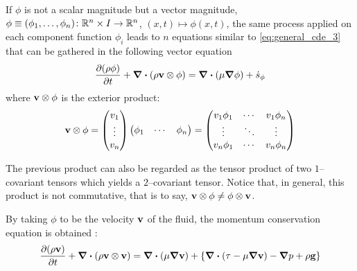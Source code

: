 If $\phi$ is not a scalar magnitude but a vector magnitude, \ie $\phi \equiv
(\phi_1, \ldots, \phi_n) \colon \mathbb{R}^n \times I \to \mathbb{R}^n$, $(x, t)
\mapsto \phi(x, t)$, the same process applied on each component function
$\phi_i$ leads to $n$ equations similar to \eqref{eq:general_cde_3} that can be
gathered in the following vector equation
\begin{equation}
	\pdv{(\rho \phi)}{t} + \div(\rho \vb{v} \otimes \phi) = 
	\div(\mu \grad{\phi}) + \dot{s}_\phi
\end{equation}
where $\vb{v} \otimes \phi$ is the exterior product:
\begin{equation}
	\vb{v} \otimes \phi =	
	\begin{pmatrix}
		v_1 \\ \vdots \\ v_n
	\end{pmatrix}
	\begin{pmatrix}
		\phi_1 & \cdots & \phi_n
	\end{pmatrix} = 
	\begin{pmatrix}
		v_1 \phi_1  & \cdots & v_1 \phi_n \\
		\vdots & \ddots & \vdots \\
		v_n \phi_1  & \cdots & v_n \phi_n
	\end{pmatrix}
\end{equation}

The previous product can also be regarded as the tensor product of two
$1$--covariant tensors which yields a $2$--covariant tensor. Notice that, in
general, this product is not commutative, that is to say, $\vb{v} \otimes \phi
\neq \phi \otimes \vb{v}$.

By taking $\phi$ to be the velocity $\vb{v}$ of the fluid, the momentum
conservation equation is obtained \cite{cttc_cde_2021}:
\begin{equation}
	\pdv{(\rho \vb{v})}{t} + \div(\rho \vb{v} \otimes \vb{v}) = 
	\div(\mu \grad{\vb{v}}) + \left\{ \div(\vb{\tau - \mu \grad{\vb{v}}}) - \grad{p} + \rho \vb{g} \right\}
\end{equation}



